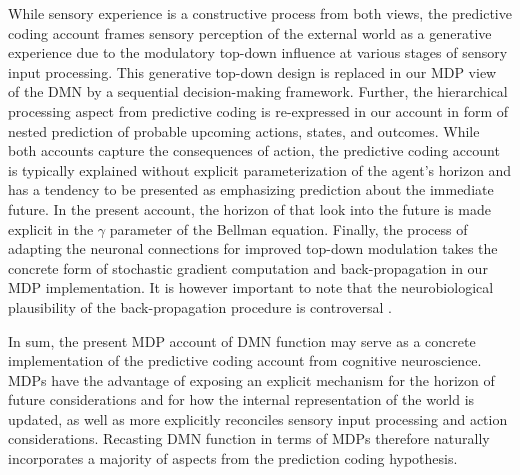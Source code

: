 \documentclass[10pt,letterpaper]{article}
\newcommand{\suggestremove}[1]{{\color{red} \sout{#1}}}
\begin{document}
While sensory experience is a constructive process from both views,
the predictive coding account frames
sensory perception of the external world
as a generative experience due to the modulatory top-down influence at
various stages of sensory input processing.
This generative top-down design is replaced in our MDP view of the DMN
by a sequential decision-making framework.
Further,
the hierarchical processing aspect from predictive coding
is re-expressed in our account in form of
nested prediction of probable upcoming actions, states, and outcomes.
While both accounts capture the consequences of action,
the predictive coding account is typically explained without
explicit parameterization of the agent's horizon and
has a tendency to be presented as emphasizing prediction about the
immediate future.
In the present account, the horizon of that
look into the future is made explicit in the $\gamma$ parameter
of the Bellman equation.
Finally,
the process of adapting the neuronal connections
for improved top-down modulation
takes the concrete form of stochastic gradient computation and
back-propagation in our MDP implementation.
It is however important to note that
the neurobiological plausibility of
the back-propagation procedure is controversal
\citep{goodfellow2016deep}.


In sum,
the present MDP account of DMN function may serve as a concrete implementation of
the predictive coding account from cognitive neuroscience.
MDPs have the advantage of exposing an explicit
mechanism for the horizon of future considerations and for
how the internal representation of the world is updated,
as well as
more explicitly reconciles sensory input processing and action considerations.
%
Recasting DMN function in terms of MDPs therefore naturally incorporates
a majority of aspects from the prediction coding hypothesis.
\end{document}
